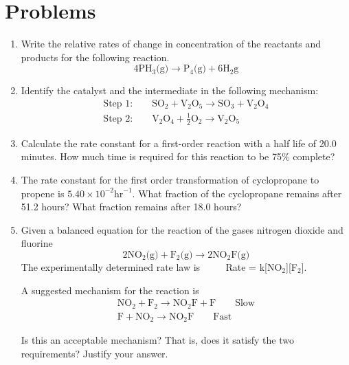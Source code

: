 \documentclass[../chem.tex]{subfiles}
\begin{document}
\section*{Problems}
\begin{enumerate}
    \item Write the relative rates of change in concentration of the reactants and products for the following reaction.
    \[4\text{PH}_3\text{(g)}\rightarrow \text{P}_4\text{(g)}+6\text{H}_2\text{g}\]
    \item Identify the catalyst and the intermediate in the following mechanism:
    \begin{align*}
        \text{Step 1:}\qquad \text{SO}_2+\text{V}_2\text{O}_5\rightarrow \text{SO}_3+\text{V}_2\text{O}_4\\
        \text{Step 2:}\qquad \text{V}_2\text{O}_4+\frac{1}{2}\text{O}_2\rightarrow \text{V}_2\text{O}_5
    \end{align*}
    \item Calculate the rate constant for a first-order reaction with a half life of 20.0 minutes. How much time is required for this reaction to be 75\% complete?
    \item The rate constant for the first order transformation of cyclopropane to propene is $5.40\times 10^{-2}\text{hr}^{-1}$. What fraction of the cyclopropane remains after 51.2 hours? What fraction remains after 18.0 hours?
    \item Given a balanced equation for the reaction of the gases nitrogen dioxide and fluorine
    \[2\text{NO}_2\text{(g)}+\text{F}_2\text{(g)}\rightarrow 2\text{NO}_2\text{F(g)}\]
    The experimentally determined rate law is $\qquad$ Rate = k[NO$_2$][F$_2$].
    
    A suggested mechanism for the reaction is 
    \begin{align*}
    \text{NO}_2+\text{F}_2\rightarrow \text{NO}_2\text{F}+\text{F}\qquad \text{Slow}\\
    \text{F}+\text{NO}_2\rightarrow \text{NO}_2\text{F}\qquad \text{Fast}
    \end{align*}

    Is this an acceptable mechanism? That is, does it satisfy the two requirements? Justify your answer.
\end{enumerate}
\end{document}
